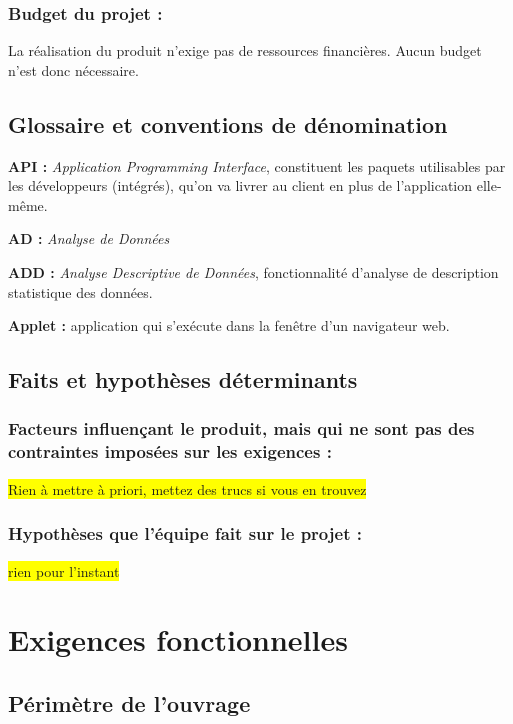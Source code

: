 			\subsubsection{Budget du projet :}
				La réalisation du produit n'exige pas de ressources financières. Aucun budget n'est donc nécessaire.
		
		\subsection{Glossaire et conventions de dénomination}
			\begin{description}[style=unboxed,leftmargin=0.2cm]
			\item\textbf{API :} \textit{Application Programming Interface}, constituent les paquets utilisables par les développeurs (intégrés), qu'on va livrer au client en plus de l'application elle-même.
			\item\textbf{AD :} \textit{Analyse de Données}
			\item\textbf{ADD :} \textit{Analyse Descriptive de Données}, fonctionnalité d'analyse de description statistique des données.
			\item\textbf{Applet :} application qui s'exécute dans la fenêtre d'un navigateur web.
			\end{description}
			
		\subsection{Faits et hypothèses déterminants}
			\subsubsection{Facteurs influençant le produit, mais qui ne sont pas des contraintes imposées sur les exigences :}
				\colorbox{yellow}{Rien à mettre à priori, mettez des trucs si vous en trouvez}
			\subsubsection{Hypothèses que l’équipe fait sur le projet :}
				\colorbox{yellow}{rien pour l'instant}
		
	\section{Exigences fonctionnelles}
	
		\subsection{Périmètre de l'ouvrage}
		
